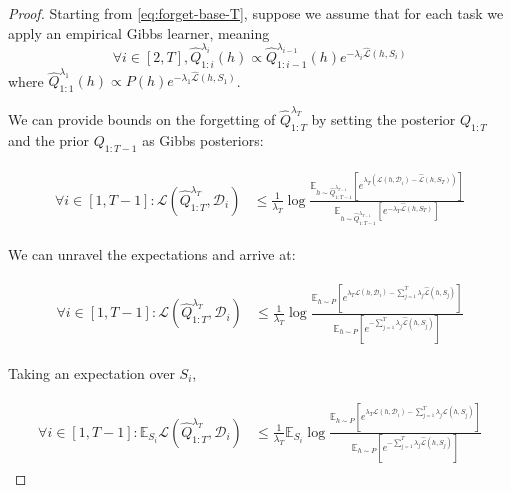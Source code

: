 \documentclass{article}
\theoremstyle{plain}
\theoremstyle{definition}
\theoremstyle{remark}
\begin{document}
\begin{proof}
    Starting from \eqref{eq:forget-base-T}, suppose we assume that for each task we apply an empirical Gibbs learner, meaning $$\forall i\in[2,T], \hat{Q}^{\lambda_i}_{1:i}(h)\propto \hat{Q}^{\lambda_{i-1}}_{1:i-1}(h)e^{-\lambda_i\hat{\mathcal{L}}(h,S_i)}$$ 
where $\hat{Q}^{\lambda_1}_{1:1}(h)\propto P(h)e^{-\lambda_1\hat{\mathcal{L}}(h,S_1)}$.

We can provide bounds on the forgetting of $\hat{Q}^{\lambda_T}_{1:T}$ by setting the posterior $Q_{1:T}$ and the prior $Q_{1:T-1}$ as Gibbs posteriors:


\begin{align*} 
\begin{split}
\forall i\in[1,T-1]:
\mathcal{L}(\hat{Q}^{\lambda_T}_{1:T}, \mathcal{D}_i) &\leq \frac{1}{\lambda_T}\log\frac{\mathbb{E}_{h\sim \hat{Q}^{\lambda_{T-1}}_{1:T-1}}\left [e^{\lambda_T(\mathcal{L}(h,\mathcal{D}_i)-\hat{\mathcal{L}}(h,S_T))} \right ]}{\mathbb{E}_{h\sim \hat{Q}^{\lambda_{T-1}}_{1:T-1}}\left [e^{-\lambda_T\hat{\mathcal{L}}(h,S_T)} \right ]}
\end{split}
\end{align*}

We can unravel the expectations and arrive at:

\begin{align*} 
\begin{split}
\forall i\in[1,T-1]:
\mathcal{L}(\hat{Q}^{\lambda_T}_{1:T}, \mathcal{D}_i) &\leq \frac{1}{\lambda_T}\log\frac{\mathbb{E}_{h\sim P}\left [e^{\lambda_T\mathcal{L}(h,\mathcal{D}_i)-\sum_{j=1}^{T}\lambda_j\hat{\mathcal{L}}(h,S_j)} \right ]}{\mathbb{E}_{h\sim P}\left [e^{-\sum_{j=1}^{T}\lambda_j\hat{\mathcal{L}}(h,S_j)} \right ]}
\end{split}
\end{align*}

Taking an expectation over $S_i$,

\begin{align*} 
\begin{split}
\forall i\in[1,T-1]:
\mathbb{E}_{S_i}\mathcal{L}(\hat{Q}^{\lambda_T}_{1:T}, \mathcal{D}_i) &\leq \frac{1}{\lambda_T}\mathbb{E}_{S_i}\log\frac{\mathbb{E}_{h\sim P}\left [e^{\lambda_T\mathcal{L}(h,\mathcal{D}_i)-\sum_{j=1}^{T}\lambda_j\hat{\mathcal{L}}(h,S_j)} \right ]}{\mathbb{E}_{h\sim P}\left [e^{-\sum_{j=1}^{T}\lambda_j\hat{\mathcal{L}}(h,S_j)} \right ]}
\end{split}
\end{align*}


\end{proof}
\end{document}
